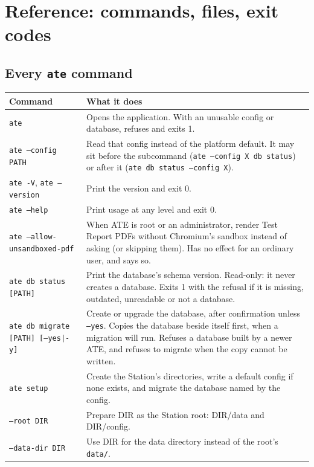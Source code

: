 \chapter{Reference: commands, files, exit codes}\label{ch:reference}

\section{Every \texttt{ate} command}

\begingroup\footnotesize
\begin{longtable}{@{}>{\raggedright\arraybackslash}p{5.2cm}>{\raggedright\arraybackslash}p{9.6cm}@{}}
\toprule
Command & What it does \\
\midrule
\endhead
\texttt{ate} & Opens the application. With an unusable config or database, refuses and exits 1. \\
\texttt{ate --config PATH} & Read that config instead of the platform default. It may sit before the
  subcommand (\texttt{ate --config X db status}) or after it (\texttt{ate db status --config X}). \\
\texttt{ate -V}, \texttt{ate --version} & Print the version and exit 0. \\
\texttt{ate --help} & Print usage at any level and exit 0. \\
\texttt{ate --allow-unsandboxed-pdf} & When ATE is root or an administrator, render Test Report PDFs
  without Chromium's sandbox instead of asking (or skipping them). Has no effect for an ordinary
  user, and says so. \\
\texttt{ate db status [PATH]} & Print the database's schema version. Read-only: it never creates a
  database. Exits 1 with the refusal if it is missing, outdated, unreadable or not a database. \\
\texttt{ate db migrate [PATH] [--yes|-y]} & Create or upgrade the database, after confirmation unless
  \texttt{--yes}. Copies the database beside itself first, when a migration will run. Refuses a
  database built by a newer ATE, and refuses to migrate when the copy cannot be written. \\
\texttt{ate setup} & Create the Station's directories, write a default config if none exists, and
  migrate the database named by the config. \\
\texttt{--root DIR} & Prepare DIR as the Station root: DIR/data and DIR/config. \\
\texttt{--data-dir DIR} & Use DIR for the data directory instead of the root's \texttt{data/}. \\

\end{longtable}
